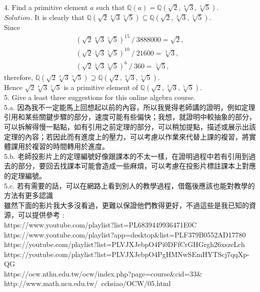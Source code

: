 \documentclass[12pt]{book}
\begin{document}
\begin{CJK}{UTF8}{bsmi}
\clearpage

4. Find a primitive element $a$ such that $\mathbb{Q}(a)=\mathbb{Q}(\sqrt{2}, \sqrt[3]{3}, \sqrt[5]{5})$. \\
$Solution$. It is clearly that $\mathbb{Q}(\sqrt{2}\sqrt[3]{3}\sqrt[5]{5})\subseteq\mathbb{Q}(\sqrt{2}, \sqrt[3]{3}, \sqrt[5]{5})$. \\
Since 
\begin{eqnarray*}
(\sqrt{2}\sqrt[3]{3}\sqrt[5]{5})^{15}\ /\ 3888000 = \sqrt{2}, \\
(\sqrt{2}\sqrt[3]{3}\sqrt[5]{5})^{10}\ /\ 21600 = \sqrt[3]{3}, \\
(\sqrt{2}\sqrt[3]{3}\sqrt[5]{5})^{6} \ /\ 360 = \sqrt[5]{5}, 
\end{eqnarray*}
therefore, $\mathbb{Q}(\sqrt{2}\sqrt[3]{3}\sqrt[5]{5})\supseteq\mathbb{Q}(\sqrt{2}, \sqrt[3]{3}, \sqrt[5]{5})$. \\
Hence $\sqrt{2}\sqrt[3]{3}\sqrt[5]{5}$ is a primitive element of $\mathbb{Q}(\sqrt{2}, \sqrt[3]{3}, \sqrt[5]{5})$. \\

5. Give a least three suggestions for this online algebra course. \\

5.a. 因為我不一定能馬上回想起以前的內容，所以我覺得老師講的證明，例如定理引用和某些關鍵步驟的部分，速度可能有些偏快；我想，就證明中較抽象的部分，可以拆解得慢一點點，如有引用之前定理的部分，可以稍加提點，描述或展示出該定理的內容；若因此而有進度上的壓力，可以考慮以作業來代替上課的複習，將實體課用於複習的時間轉用於進度。 \\

5.b. 老師投影片上的定理編號好像跟課本的不太一樣，在證明過程中若有引用到過去的部分，要回去找課本可能會造成一些麻煩，可以考慮在投影片標註課本上對應的定理編號。 \\

5.c. 若有需要的話，可以在網路上看到別人的教學過程，借鑑後應該也能對教學的方法有更多認識 \\
雖然下面的影片我大多沒看過，更難以保證他們教得更好，不過這些是我已知的資源，可以提供參考 : \\
https://www.youtube.com/playlist?list=PL6839449936471E0C \\
https://www.youtube.com/playlist?app=desktop\&list=PLF379B0552AD17780 \\
https://youtube.com/playlist?list=PLVJXJebpO4Pi0DFfCrGHGrgh26xszeLch \\
https://youtube.com/playlist?list=PLVJXJebpO4PgHMNwSEmHYTScj7qqXp-QG \\
https://ocw.nthu.edu.tw/ocw/index.php?page=course\&cid=33\& \\
http://www.math.ncu.edu.tw/~cchsiao/OCW/05.html 

\end{CJK}
\end{document}
